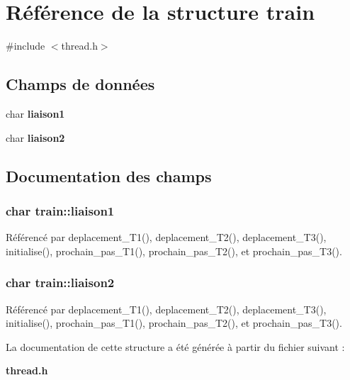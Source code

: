 \section{Référence de la structure train}
\label{structtrain}


{\ttfamily \#include $<$thread.\+h$>$}

\subsection*{Champs de données}
\begin{DoxyCompactItemize}
\item 
char {\bf liaison1}
\item 
char {\bf liaison2}
\end{DoxyCompactItemize}


\subsection{Documentation des champs}
\subsubsection[{liaison1}]{\setlength{\rightskip}{0pt plus 5cm}char train\+::liaison1}\label{structtrain_a683da121a788420db697553f23155b64}


Référencé par deplacement\+\_\+\+T1(), deplacement\+\_\+\+T2(), deplacement\+\_\+\+T3(), initialise(), prochain\+\_\+pas\+\_\+\+T1(), prochain\+\_\+pas\+\_\+\+T2(), et prochain\+\_\+pas\+\_\+\+T3().

\subsubsection[{liaison2}]{\setlength{\rightskip}{0pt plus 5cm}char train\+::liaison2}\label{structtrain_a890410ecb8fd09259ea13d39a814559b}


Référencé par deplacement\+\_\+\+T1(), deplacement\+\_\+\+T2(), deplacement\+\_\+\+T3(), initialise(), prochain\+\_\+pas\+\_\+\+T1(), prochain\+\_\+pas\+\_\+\+T2(), et prochain\+\_\+pas\+\_\+\+T3().



La documentation de cette structure a été générée à partir du fichier suivant \+:\begin{DoxyCompactItemize}
\item 
{\bf thread.\+h}\end{DoxyCompactItemize}
